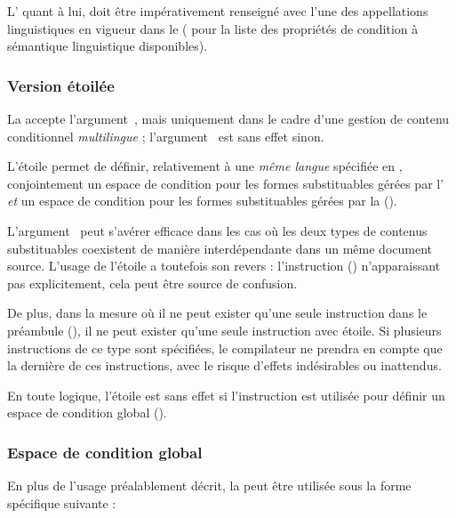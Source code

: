 \documentclass{article}
\begin{document}
L' quant à lui, doit être impérativement renseigné avec l'une des appellations linguistiques en vigueur dans le  ( pour la liste des propriétés de condition à sémantique linguistique disponibles).

\subsubsection{Version étoilée}\label{CtDoc_Commandes_SetCondiSpace_Etoile}
La  accepte l'argument~\val{*}, mais uniquement dans le cadre d'une gestion de contenu conditionnel \emph{multilingue} ; l'argument~\val{*} est sans effet sinon.

L'étoile permet de définir, relativement à une \emph{même langue} spécifiée en , conjointement un espace de condition pour les formes substituables gérées par l' \emph{et} un espace de condition pour les formes substituables gérées par la  ().

L'argument~\val{*} peut s'avérer efficace dans les cas où les deux types de contenus substituables coexistent de manière interdépendante dans un même document source. L'usage de l'étoile a toutefois son revers : l'instruction  () n'apparaissant pas explicitement, cela peut être source de confusion.

De plus, dans la mesure où il ne peut exister qu'une seule instruction  dans le préambule (), il ne peut exister qu'une seule instruction  avec étoile. Si plusieurs instructions de ce type sont spécifiées, le compilateur ne prendra en compte que la dernière de ces instructions, avec le risque d'effets indésirables ou inattendus.

En toute logique, l'étoile est sans effet si l'instruction  est utilisée pour définir un espace de condition global ().

\subsubsection{Espace de condition global}\label{CtDoc_Commandes_SetCondiSpace_EspaceConditionGlobal}
En plus de l'usage préalablement décrit, la  peut être utilisée sous la forme spécifique suivante :
\end{document}
